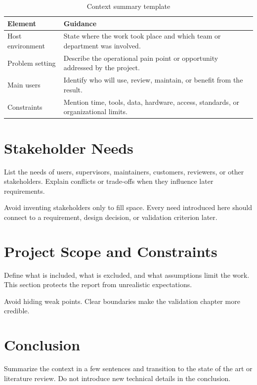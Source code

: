 \begin{table}[H]
    \centering
    \caption{Context summary template}
    \label{tab:context-summary-template}
    \small
    \begin{tabular}{L{0.28\textwidth}L{0.62\textwidth}}
        \toprule
        \textbf{Element} & \textbf{Guidance} \\
        \midrule
        Host environment & State where the work took place and which team or department was involved. \\
        \tabrowsep
        Problem setting & Describe the operational pain point or opportunity addressed by the project. \\
        \tabrowsep
        Main users & Identify who will use, review, maintain, or benefit from the result. \\
        \tabrowsep
        Constraints & Mention time, tools, data, hardware, access, standards, or organizational limits. \\
        \bottomrule
    \end{tabular}
\end{table}

\section{Stakeholder Needs}
List the needs of users, supervisors, maintainers, customers, reviewers, or other stakeholders. Explain conflicts or trade-offs when they influence later requirements.

Avoid inventing stakeholders only to fill space. Every need introduced here should connect to a requirement, design decision, or validation criterion later.

\section{Project Scope and Constraints}
Define what is included, what is excluded, and what assumptions limit the work. This section protects the report from unrealistic expectations.

Avoid hiding weak points. Clear boundaries make the validation chapter more credible.

\section{Conclusion}
Summarize the context in a few sentences and transition to the state of the art or literature review. Do not introduce new technical details in the conclusion.